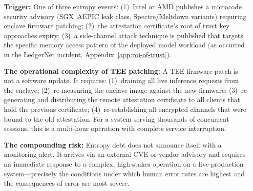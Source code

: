 \begin{tcolorbox}[scenariobox,
  title={Scenario 4 --- The Decaying TEE Enclave (Type~4 Debt)}]

\textbf{Trigger:}
One of three entropy events: (1)~Intel or AMD publishes a
microcode security advisory (SGX~AEPIC leak class,
Spectre/Meltdown variants) requiring enclave firmware
patching; (2)~the attestation certificate's root of trust
key approaches expiry; (3)~a side-channel attack technique
is published that targets the specific memory access pattern
of the deployed model workload (as occurred in the LedgerNet
incident, Appendix~\ref{app:roi-of-trust}).

\textbf{The operational complexity of TEE patching:}
A TEE firmware patch is not a software update.
It requires: (1)~draining all live inference requests from
the enclave; (2)~re-measuring the enclave image against
the new firmware; (3)~re-generating and distributing the
remote attestation certificate to all clients that hold
the previous certificate; (4)~re-establishing all encrypted
channels that were bound to the old attestation.
For a system serving thousands of concurrent sessions,
this is a multi-hour operation with complete service
interruption.

\textbf{The compounding risk:}
Entropy debt does not announce itself with a monitoring
alert.
It arrives via an external CVE or vendor advisory and
requires an immediate response to a complex, high-stakes
operation on a live production system---precisely the
conditions under which human error rates are highest and
the consequences of error are most severe.
\end{tcolorbox}

